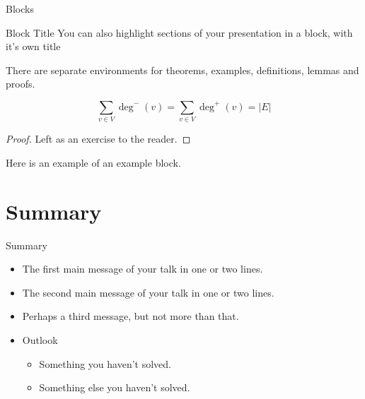 \documentclass[mathserif]{beamer}
\begin{document}
\begin{frame}{Blocks}
\begin{block}{Block Title}
You can also highlight sections of your presentation in a block, with it's own title
\end{block}
\begin{theorem}
There are separate environments for theorems, examples, definitions, lemmas and proofs.
\end{theorem}
\begin{lemma}
    \[\sum_{v\in V}\deg^-(v)=\sum_{v\in V}\deg^+(v)=|E|\]
\end{lemma}
\begin{proof}
    Left as an exercise to the reader.
\end{proof}
\begin{example}
Here is an example of an example block.
\end{example}
\end{frame}

\section*{Summary}

\begin{frame}{Summary}
    \begin{itemize}
    \item
        The \alert{first main message} of your talk in one or two lines.
    \item
        The \alert{second main message} of your talk in one or two lines.
    \item
        Perhaps a \alert{third message}, but not more than that.
    \end{itemize}

    \begin{itemize}
    \item
        Outlook
        \begin{itemize}
        \item
            Something you haven't solved.
        \item
            Something else you haven't solved.
        \end{itemize}
    \end{itemize}
\end{frame}
\end{document}
